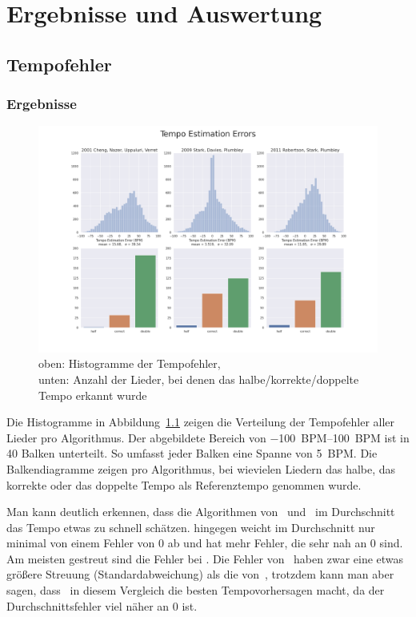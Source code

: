 \chapter{Ergebnisse und Auswertung}
\label{ergebnisse}


\section{Tempofehler}
{
	\subsection{Ergebnisse}
	{
		\begin{figure}[h]
			\hspace{-2.8cm}
			\includegraphics[scale=0.45]{resources/tempo_error_histogram.png}
			\caption{
				oben: Histogramme der Tempofehler, \\
				unten: Anzahl der Lieder, bei denen das halbe/korrekte/doppelte Tempo erkannt wurde
			}
			\label{fig:tempoerror}
		\end{figure}

		Die Histogramme in Abbildung~\ref{fig:tempoerror} zeigen die Verteilung der Tempofehler aller Lieder pro Algorithmus.
		Der abgebildete Bereich von \SIrange{-100}{100}{BPM} ist in \num{40} Balken unterteilt.
		So umfasst jeder Balken eine Spanne von \SI{5}{BPM}.
		Die Balkendiagramme zeigen pro Algorithmus,
			bei wievielen Liedern das halbe, das korrekte oder das doppelte Tempo als Referenztempo genommen wurde.

		Man kann deutlich erkennen,
			dass die Algorithmen von~\cite{2001_BeatThis} und~\cite{2011_PlRoSt} im Durchschnitt das Tempo etwas zu schnell schätzen.
		\cite{2009_DaPlSt} hingegen weicht im Durchschnitt nur minimal von einem Fehler von 0 ab und
			hat mehr Fehler, die sehr nah an 0 sind.
		Am meisten gestreut sind die Fehler bei \cite{2001_BeatThis}.
		Die Fehler von~\cite{2009_DaPlSt} haben zwar eine etwas größere Streuung (Standardabweichung) als die von~\cite{2011_PlRoSt},
			trotzdem kann man aber sagen,
			dass~\cite{2009_DaPlSt} in diesem Vergleich die besten Tempovorhersagen macht,
			da der Durchschnittsfehler viel näher an 0 ist.

}}
